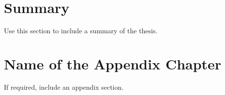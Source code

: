 \documentclass[a4paper,12pt,twoside,no-math]{report}
\begin{document}
\clearpage

\newpage
\chapter{Summary}\label{chap:summary}

\renewcommand\thefigure{\thechapter.\arabic{figure}}    
\renewcommand{\theequation}{\thechapter.\arabic{equation}}
\setcounter{equation}{0}
\setcounter{figure}{0}

Use this section to include a summary of the thesis.


\newpage
\appendix


\chapter{Name of the Appendix Chapter}\label{app:appendix1}

\renewcommand\thefigure{\thechapter.\arabic{figure}}    
\renewcommand{\theequation}{\thechapter.\arabic{equation}}
\setcounter{equation}{0}
\setcounter{figure}{0}

If required, include an appendix section.


\clearpage

\newpage



\end{document}
